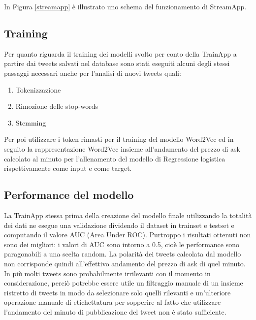 In Figura \ref{streamapp} è illustrato uno schema del funzionamento di StreamApp.

\subsection{Training}

Per quanto riguarda il training dei modelli svolto per conto della TrainApp a partire dai tweets
salvati nel database sono stati eseguiti alcuni degli stessi passaggi necessari anche per
l'analisi di nuovi tweets quali:

\begin{enumerate}
    \item Tokenizzazione
    \item Rimozione delle stop-words
    \item Stemming
\end{enumerate}

Per poi utilizzare i token rimasti per il training del modello Word2Vec ed in seguito la
rappresentazione Word2Vec insieme all'andamento del prezzo di ask calcolato al minuto
per l'allenamento del modello di Regressione logistica rispettivamente come input e come target.

\subsection{Performance del modello}

La TrainApp stessa prima della creazione del modello finale utilizzando la totalità dei dati
ne esegue una validazione dividendo il dataset in trainset e testset e computando il valore AUC
(Area Under ROC).
Purtroppo i risultati ottenuti non sono dei migliori: i valori di AUC sono intorno a 0.5, cioè
le performance sono paragonabili a una scelta random.
La polarità dei tweets calcolata dal modello non corrisponde quindi all'effettivo andamento del
prezzo di ask di quel minuto.
In più molti tweets sono probabilmente irrilevanti con il momento in considerazione, perciò potrebbe essere utile un
filtraggio manuale di un insieme ristretto di tweets in modo da selezionare solo quelli rilevanti
e un'ulteriore operazione manuale di etichettatura per sopperire al fatto che utilizzare l'andamento
del minuto di pubblicazione del tweet non è stato sufficiente.





